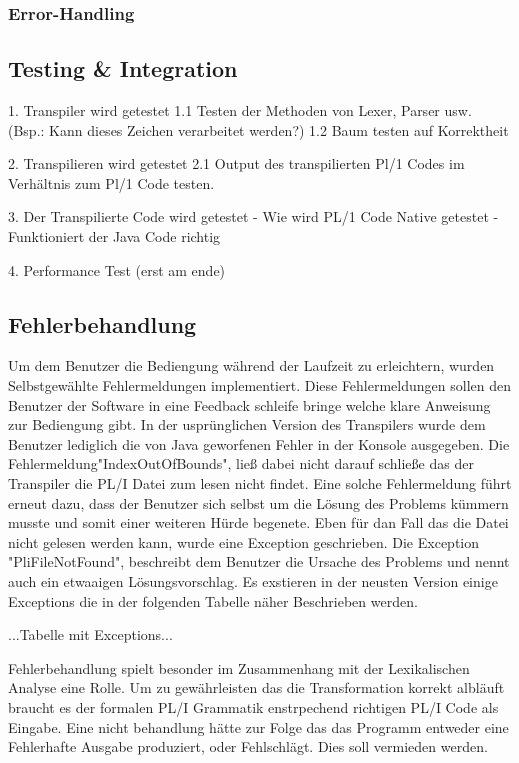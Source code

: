 \subsubsection{Error-Handling}

\subsection{Testing & Integration}
1. Transpiler wird getestet
1.1 Testen der Methoden von Lexer, Parser usw. (Bsp.: Kann dieses Zeichen verarbeitet werden?)
1.2 Baum testen auf Korrektheit

2. Transpilieren wird getestet
2.1 Output des transpilierten Pl/1 Codes im Verhältnis zum Pl/1 Code testen.

3. Der Transpilierte Code wird getestet
- Wie wird PL/1 Code Native getestet
- Funktioniert der Java Code richtig

4. Performance Test (erst am ende)

\subsection{Fehlerbehandlung}
Um dem Benutzer die Bediengung während der Laufzeit zu erleichtern, wurden Selbstgewählte Fehlermeldungen implementiert. Diese Fehlermeldungen sollen den Benutzer der Software in eine Feedback schleife bringe welche klare Anweisung zur Bediengung gibt. In der usprünglichen Version des Transpilers wurde dem Benutzer lediglich die von Java geworfenen Fehler in der Konsole ausgegeben. Die Fehlermeldung"IndexOutOfBounds", ließ dabei nicht darauf schließe das der Transpiler die PL/I Datei zum lesen nicht findet. Eine solche Fehlermeldung führt erneut dazu, dass der Benutzer sich selbst um die Lösung des Problems kümmern musste und somit einer weiteren Hürde begenete.
Eben für dan Fall das die Datei nicht gelesen werden kann, wurde eine Exception geschrieben. Die Exception "PliFileNotFound", beschreibt dem Benutzer die Ursache des Problems und nennt auch ein etwaaigen Lösungsvorschlag. Es exstieren in der neusten Version einige Exceptions die in der folgenden Tabelle näher Beschrieben werden.

...Tabelle mit Exceptions...

Fehlerbehandlung spielt besonder im Zusammenhang mit der Lexikalischen Analyse eine Rolle. Um zu gewährleisten das die Transformation korrekt albläuft braucht es der formalen PL/I Grammatik enstrpechend richtigen PL/I Code als Eingabe. Eine nicht behandlung hätte zur Folge das das Programm entweder eine Fehlerhafte Ausgabe produziert, oder Fehlschlägt. Dies soll vermieden werden.

